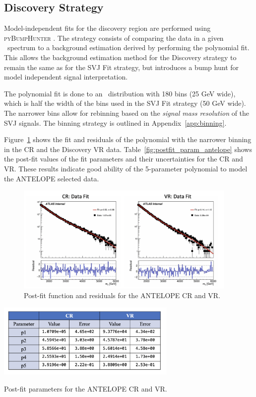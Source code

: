 \subsection{Discovery Strategy}
\label{subsec:fit_bh}

Model-independent fits for the discovery region are performed using \textsc{pyBumpHunter} \cite{bumphunt}.
The strategy consists of comparing the data in a given \mt~spectrum to a background estimation derived by performing the polynomial fit.
This allows the background estimation method for the Discovery strategy to remain the same as for the SVJ Fit strategy, but introduces a bump hunt for model independent signal interpretation. 

The polynomial fit is done to an \mt~distribution with 180 bins (25 GeV wide), which is half the width of the bins used in the SVJ Fit strategy (50 GeV wide). %
The narrower bins allow for rebinning based on the \textit{signal mass resolution} of the SVJ signals.
The binning strategy is outlined in Appendix~\ref{app:binning}.

Figure~\ref{fig:bkgfit_data_crvr_antelope} shows the fit and residuals of the polynomial with the narrower binning in the CR and the Discovery VR data.
Table~\ref{fig:postfit_param_antelope} shows the post-fit values of the fit parameters and their uncertainties for the CR and VR. 
These results indicate good ability of the 5-parameter polynomial to model the ANTELOPE selected data.

\begin{figure}[!htbp]
\centering
   \includegraphics[width=0.95\textwidth]{figures/stats/bkgfit_data_crvr_antelope}
    \caption{Post-fit function and residuals for the ANTELOPE CR and VR.
    \label{fig:bkgfit_data_crvr_antelope}}
\end{figure}

\begin{table}[!htbp]
\centering
   \includegraphics[width=0.65\textwidth]{figures/stats/postfit_param_antelope}
    \caption{Post-fit parameters for the ANTELOPE CR and VR.
    \label{fig:postfit_param_antelope}}
\end{table}

